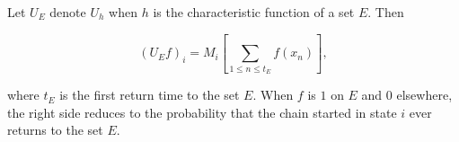 Let $U_E$ denote $U_h$ when $h$ is the characteristic function of a set $E$. Then

$$\left(U_E f\right)_i = M_i \left[ \sum_{1 \leq n \leq t_E} f(x_n) \right],$$

where $t_E$ is the first return time to the set $E$. When $f$ is $1$ on $E$ and $0$ elsewhere, the right side reduces to the probability that the chain started in state $i$ ever returns to the set $E$.
